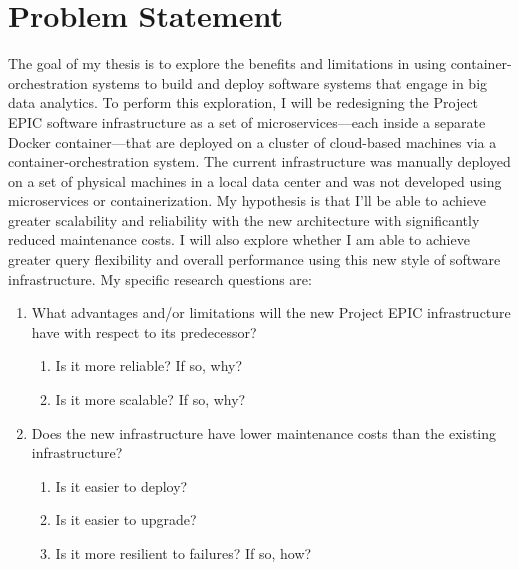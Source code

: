 
\chapter{Problem Statement} %

\label{Chapter3} %

The goal of my thesis is to explore the benefits and limitations in using container-orchestration systems to build and deploy software systems that engage in big data analytics. To perform this exploration, I will be redesigning the Project EPIC software infrastructure as a set of microservices---each inside a separate Docker container---that are deployed on a cluster of cloud-based machines via a container-orchestration system. The current infrastructure was manually deployed on a set of physical machines in a local data center and was not developed using microservices or containerization. My hypothesis is that I’ll be able to achieve greater scalability and reliability with the new architecture with significantly reduced maintenance costs. I will also explore whether I am able to achieve greater query flexibility and overall performance using this new style of software infrastructure. My specific research questions are:

\begin{enumerate}
	\item What advantages and/or limitations will the new Project EPIC infrastructure have with respect to its predecessor?	
	\begin{enumerate}
		\item Is it more reliable? If so, why?
		\item Is it more scalable? If so, why?
	\end{enumerate}
	\item Does the new infrastructure have lower maintenance costs than the existing infrastructure?
	\begin{enumerate}
		\item Is it easier to deploy?
		\item Is it easier to upgrade?
		\item Is it more resilient to failures? If so, how?
	\end{enumerate}
\end{enumerate}


